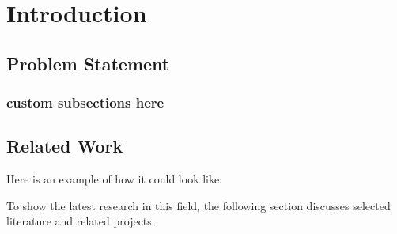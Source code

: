\chapter{Introduction}
\label{chapter:Introduction}

\section{Problem Statement}



\subsection{custom subsections here}



\section{Related Work}
\label{related_work}

Here is an example of how it could look like:

To show the latest research in this field, the following section discusses selected literature and related projects. \\

